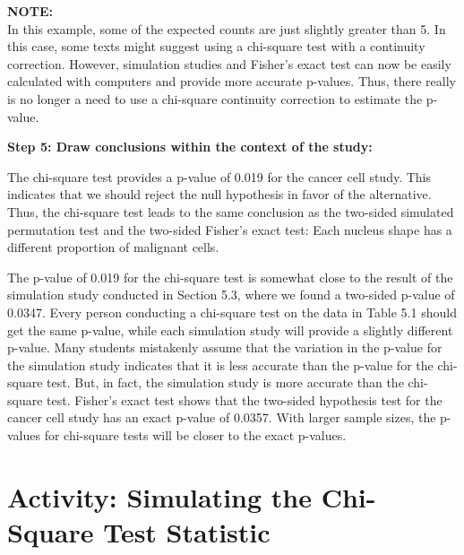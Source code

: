 \documentclass[
]{report}
\begin{document}
\large

\textbf{NOTE:}\\
In this example, some of the expected counts are just slightly greater than 5. In this case, some texts might suggest using a chi-square test with a continuity correction. However, simulation studies and Fisher's exact test can now be easily calculated with computers and provide more accurate p-values. Thus, there really is no longer a need to use a chi-square continuity correction to estimate the p-value.\\
\normalsize

\textbf{Step 5: Draw conclusions within the context of the study:}

The chi-square test provides a p-value of 0.019 for the cancer cell study. This indicates that we should reject the null hypothesis in favor of the alternative. Thus, the chi-square test leads to the same conclusion as the two-sided simulated permutation test and the two-sided Fisher's exact test: Each nucleus shape has a different proportion of malignant cells.

The p-value of 0.019 for the chi-square test is somewhat close to the result of the simulation study conducted in Section 5.3, where we found a two-sided p-value of 0.0347. Every person conducting a chi-square test on the data in Table 5.1 should get the same p-value, while each simulation study will provide a slightly different p-value. Many students mistakenly assume that the variation in the p-value for the simulation study indicates that it is less accurate than the p-value for the chi-square test. But, in fact, the simulation study is more accurate than the chi-square test. Fisher's exact test shows that the two-sided hypothesis test for the cancer cell study has an exact p-value of 0.0357. With larger sample sizes, the p-values for chi-square tests will be closer to the exact p-values.

\hypertarget{activity-simulating-the-chi-square-test-statistic}{%
\section*{Activity: Simulating the Chi-Square Test Statistic}\label{activity-simulating-the-chi-square-test-statistic}}
\end{document}

